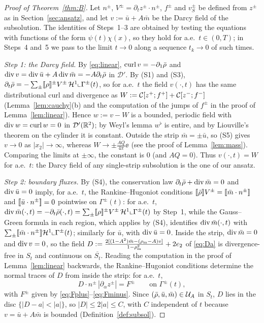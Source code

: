 \begin{proof}[Proof of Theorem~\ref{thm:B}]
Let $n^\pm$, $V^\pm=\partial_tz^\pm\cdot n^\pm$, $f^\pm$ and $v_S^\pm$ be defined from $z^\pm$ as in Section~\ref{sec:ansatz}, and let $v:=\bar u+A\bar m$ be the Darcy field of the subsolution.
The identities of Steps~1--3 are obtained by testing the equations with functions of the form $\psi(t)\chi(x)$, so they hold for a.e.\ $t\in(0,T)$; in Steps~4 and~5 we pass to the limit
$t\to0$ along a sequence $t_k\to0$ of such times.

\emph{Step 1: the Darcy field.} By \eqref{eq:linear}, $\operatorname{curl} v=-\partial_1\bar\rho$ and $\operatorname{div} v=\operatorname{div}\bar u+A\operatorname{div}\bar m=-A\partial_t\bar\rho$ in $\mathcal D'$. By (S1) and (S3), $\partial_t\bar\rho=-\sum_\pm[\![\rho]\!]^\pm V^\pm\,\mathcal H^1\llcorner\Gamma^\pm(t)$,
so for a.e.\ $t$ the field $v(\cdot,t)$ has the same distributional curl and divergence as $W:=\mathcal{C}[z^+;f^+]+\mathcal{C}[z^-;f^-]$ (Lemma~\ref{lem:cauchy}(b) and the computation of the jumps of $f^\pm$ in the proof of
Lemma~\ref{lem:linear}). Hence $w:=v-W$ is a bounded, periodic field with $\operatorname{div} w=\operatorname{curl} w=0$ in $\mathcal D'(\mathbb{R}^2)$; by Weyl's lemma $w^\flat$ is entire, and by Liouville's theorem on the cylinder it is constant.
Outside the strip $\bar m=\pm\bar u$, so (S5) gives $v\to0$ as $|x_2|\to\infty$, whereas $W\to\pm\frac{AQ}{4\pi}\ee$ (see the proof of Lemma~\ref{lem:mass}). Comparing the limits at $\pm\infty$, the constant is $0$ (and
$AQ=0$). Thus $v(\cdot,t)=W$ for a.e.\ $t$: the Darcy field of any single-strip subsolution is the one of our ansatz.

\emph{Step 2: boundary fluxes.} By (S4), the conservation law $\partial_t\bar\rho+\operatorname{div}\bar m=0$ and $\operatorname{div}\bar u=0$ imply, for a.e.\ $t$, the Rankine--Hugoniot conditions
$[\![\bar\rho]\!]V^\pm=[\![\bar m\cdot n^\pm]\!]$ and $[\![\bar u\cdot n^\pm]\!]=0$ pointwise on $\Gamma^\pm(t)$: for a.e.\ $t$,
$\operatorname{div}\bar m(\cdot,t)=-\partial_t\bar\rho(\cdot,t)=\sum_\pm[\![\rho]\!]^\pm V^\pm\,\mathcal H^1\llcorner\Gamma^\pm(t)$ by Step~1, while the Gauss--Green formula in each region, which applies by (S4),
identifies $\operatorname{div}\bar m(\cdot,t)$ with $\sum_\pm[\![\bar m\cdot n^\pm]\!]\mathcal H^1\llcorner\Gamma^\pm(t)$; similarly for $\bar u$, with $\operatorname{div}\bar u=0$. Inside the strip, $\operatorname{div}\bar m=0$ and $\operatorname{div} v=0$, so the field $D:=\frac{2[(1-A^2)\bar m-(\rho_{\mathrm m}-A)v]}{1-\rho_{\mathrm m}^2}+2e_2$ of \eqref{eq:Da} is
divergence-free in $S_t$ and continuous on $\overline{S_t}$. Reading the computation in the proof of Lemma~\ref{lem:linear} backwards, the Rankine--Hugoniot conditions determine the normal traces
of $D$ from inside the strip: for a.e.\ $t$,
\begin{equation}\label{eq:D-traces}
D\cdot n^\pm\,|\partial_\alpha z^\pm|=F^\pm\qquad\text{on }\Gamma^\pm(t),
\end{equation}
with $F^\pm$ given by \eqref{eq:Fplus}--\eqref{eq:Fminus}. Since $(\bar\rho,\bar u,\bar m)\in\mathcal{U}_A$ in $S_t$, $D$ lies in the disc $\{|D-a|<|a|\}$, so $|D|\le2|a|\le C$, with $C$ independent of $t$
because $v=\bar u+A\bar m$ is bounded (Definition~\ref{def:subsol}).


\end{proof}
